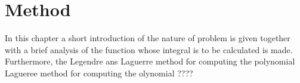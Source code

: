 \chapter{Method}
\label{chap:method} 
In this chapter a short introduction of the nature of problem is given together with a brief analysis of the function whose integral is to be calculated is made. 
Furthermore, the Legendre ans Laguerre method for computing the polynomial Lagueree method for computing the olynomial ????
